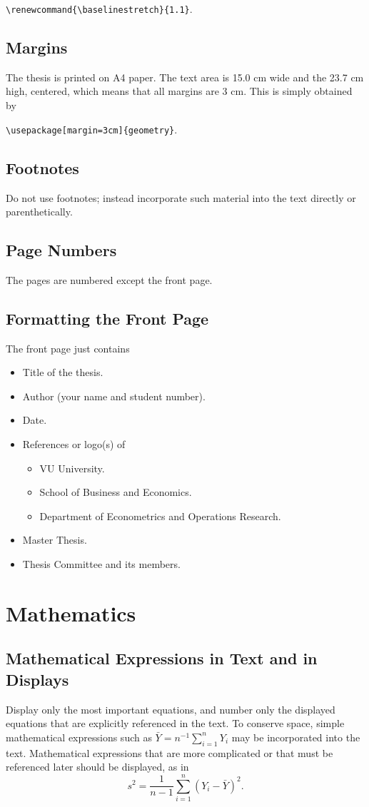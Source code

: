 \documentclass[a4paper,11pt]{article}
\theoremstyle{plain}
\theoremstyle{definition}
\begin{document}
\verb+\renewcommand{\baselinestretch}{1.1}+.

\subsection{Margins}
The thesis is printed on A4 paper.
The text area is 15.0 cm wide and the 23.7 cm high, centered, which means that
all margins are 3 cm. This is simply obtained by

\verb+\usepackage[margin=3cm]{geometry}+.

\subsection{Footnotes}
Do not use footnotes; instead incorporate such material into the text
directly or parenthetically.

\subsection{Page Numbers}
The pages are numbered except the front page.

\subsection{Formatting the Front Page}
The front page just contains
\begin{itemize}
\setlength\itemsep{-1mm}
\item
Title of the thesis.
\item
Author (your name and student number).
\item
Date.
\item
References or logo(s) of
\begin{itemize}
\item
VU University.
\item
School of Business and Economics.
\item
Department of Econometrics and Operations Research.
\end{itemize}
\item
Master Thesis.
\item
Thesis Committee and its members.
\end{itemize}


\section{Mathematics}
\subsection{Mathematical Expressions in Text and in Displays}
Display only the most important equations, and number only the
displayed equations that are explicitly referenced in the text.
To conserve space, simple mathematical expressions such as
$\bar Y = n^{-1} \sum_{i=1}^n Y_i$ may be incorporated into the text.
Mathematical expressions that are more complicated or that must be
referenced later should be displayed, as in
\[
s^2 = \frac 1 {n-1} \sum_{i=1}^n (Y_i - \bar Y)^2.
\]
\end{document}
